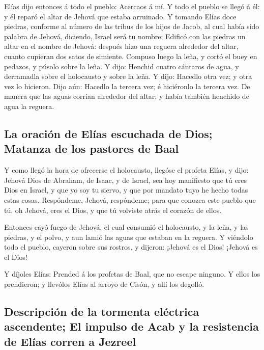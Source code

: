  Elías dijo entonces á todo el pueblo: Acercaos á mí. Y
todo el pueblo se llegó á él: y él reparó el altar de Jehová que estaba
arruinado.  Y tomando Elías doce piedras, conforme al
número de las tribus de los hijos de Jacob, al cual había sido palabra
de Jehová, diciendo, Israel será tu nombre;  Edificó con
las piedras un altar en el nombre de Jehová: después hizo una reguera
alrededor del altar, cuanto cupieran dos satos de simiente.
 Compuso luego la leña, y cortó el buey en pedazos, y
púsolo sobre la leña.  Y dijo: Henchid cuatro cántaros de
agua, y derramadla sobre el holocausto y sobre la leña. Y dijo: Hacedlo
otra vez; y otra vez lo hicieron. Dijo aún: Hacedlo la tercera vez; é
hiciéronlo la tercera vez.  De manera que las aguas corrían
alrededor del altar; y había también henchido de agua la reguera.

\hypertarget{la-oraciuxf3n-de-eluxedas-escuchada-de-dios-matanza-de-los-pastores-de-baal}{%
\subsection{La oración de Elías escuchada de Dios; Matanza de los
pastores de
Baal}\label{la-oraciuxf3n-de-eluxedas-escuchada-de-dios-matanza-de-los-pastores-de-baal}}

 Y como llegó la hora de ofrecerse el holocausto, llegóse
el profeta Elías, y dijo: Jehová Dios de Abraham, de Isaac, y de Israel,
sea hoy manifiesto que tú eres Dios en Israel, y que yo soy tu siervo, y
que por mandato tuyo he hecho todas estas cosas. 
Respóndeme, Jehová, respóndeme; para que conozca este pueblo que tú, oh
Jehová, eres el Dios, y que tú volviste atrás el corazón de ellos.

 Entonces cayó fuego de Jehová, el cual consumió el
holocausto, y la leña, y las piedras, y el polvo, y aun lamió las aguas
que estaban en la reguera.  Y viéndolo todo el pueblo,
cayeron sobre sus rostros, y dijeron: ¡Jehová es el Dios! ¡Jehová es el
Dios!

 Y díjoles Elías: Prended á los profetas de Baal, que no
escape ninguno. Y ellos los prendieron; y llevólos Elías al arroyo de
Cisón, y allí los degolló.

\hypertarget{descripciuxf3n-de-la-tormenta-eluxe9ctrica-ascendente-el-impulso-de-acab-y-la-resistencia-de-eluxedas-corren-a-jezreel}{%
\subsection{Descripción de la tormenta eléctrica ascendente; El impulso
de Acab y la resistencia de Elías corren a
Jezreel}\label{descripciuxf3n-de-la-tormenta-eluxe9ctrica-ascendente-el-impulso-de-acab-y-la-resistencia-de-eluxedas-corren-a-jezreel}}

